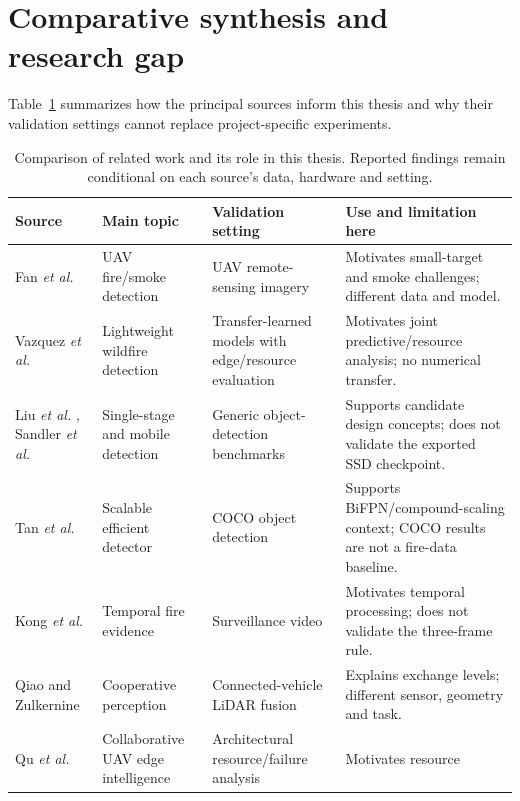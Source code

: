 \section{Comparative synthesis and research gap}
\label{sec:background:gap}

Table~\ref{tab:related-work} summarizes how the principal sources inform this
thesis and why their validation settings cannot replace project-specific
experiments.

\begin{table}[H]
  \centering
  \caption{Comparison of related work and its role in this thesis. Reported
  findings remain conditional on each source's data, hardware and setting.}
  \label{tab:related-work}
  \scriptsize
  \begin{tabularx}{\textwidth}{@{}p{}p{}p{}X@{}}
    \toprule
    Source & Main topic & Validation setting & Use and limitation here \\
    \midrule
    Fan \emph{et al.} \cite{Fan2025UAVFire} & UAV fire/smoke detection & UAV
    remote-sensing imagery & Motivates small-target and smoke challenges;
    different data and model. \\
    Vazquez \emph{et al.} \cite{Vazquez2026EdgeFire} & Lightweight wildfire
    detection & Transfer-learned models with edge/resource evaluation &
    Motivates joint predictive/resource analysis; no numerical transfer. \\
    Liu \emph{et al.} \cite{Liu2016SSD}, Sandler \emph{et al.}
    \cite{Sandler2018MobileNetV2} & Single-stage and mobile detection & Generic
    object-detection benchmarks & Supports candidate design concepts; does not
    validate the exported SSD checkpoint. \\
    Tan \emph{et al.} \cite{Tan2020EfficientDet} & Scalable efficient detector &
    COCO object detection & Supports BiFPN/compound-scaling context; COCO results
    are not a fire-data baseline. \\
    Kong \emph{et al.} \cite{Kong2016TemporalFire} & Temporal fire evidence &
    Surveillance video & Motivates temporal processing; does not validate the
    three-frame rule. \\
    Qiao and Zulkernine \cite{Qiao2023AdaptiveFusion} & Cooperative perception &
    Connected-vehicle LiDAR fusion & Explains exchange levels; different sensor,
    geometry and task. \\
    Qu \emph{et al.} \cite{Qu2024ElasticUAV} & Collaborative UAV edge
    intelligence & Architectural resource/failure analysis & Motivates resource

\end{tabularx}
\end{table}
